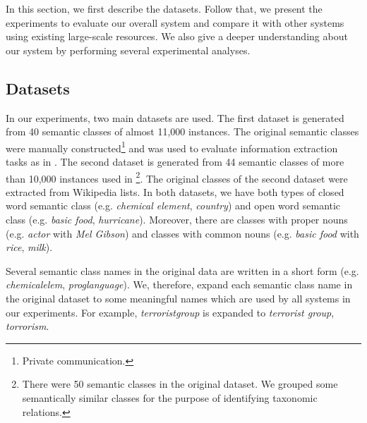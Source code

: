 In this section, we first describe the datasets. Follow that, we
present the experiments to evaluate our overall system and compare it
with other systems using existing large-scale resources. We also give
a deeper understanding about our system by performing several
experimental analyses.

\subsection{Datasets}
\label{sec:dataset}

In our experiments, two main datasets are used. The first dataset is
generated from 40 semantic classes of almost 11,000 instances. The
original semantic classes were manually constructed\footnote{Private
  communication.}  and was used to evaluate information extraction
tasks as in \cite{citeulike:1587018,pacsca-vandurme:2008:ACLMain}. The
second dataset is generated from 44 semantic classes of more than
10,000 instances used in
\cite{vyas-pantel:2009:NAACLHLT09}\footnote{There were 50 semantic
  classes in the original dataset. We grouped some semantically
  similar classes for the purpose of identifying taxonomic
  relations.}. The original classes of the second dataset were
extracted from Wikipedia lists. In both datasets, we have both types
of closed word semantic class (e.g. {\em chemical element}, {\em
  country}) and open word semantic class (e.g. {\em basic food}, {\em
  hurricane}). Moreover, there are classes with proper nouns
(e.g. {\em actor} with {\em Mel Gibson}) and classes with common nouns
(e.g. {\em basic food} with {\em rice}, {\em milk}).

Several semantic class names in the original data are written in a
short form (e.g. {\em chemicalelem}, {\em proglanguage}). We,
therefore, expand each semantic class name in the original dataset to
some meaningful names which are used by all systems in our
experiments. For example, {\em terroristgroup} is expanded to {{\em
    terrorist group}, {\em torrorism}}.

